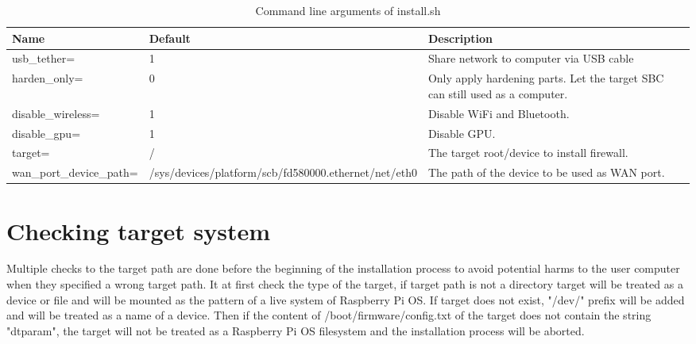 \documentclass[mscthesis]{usiinfthesis}
\begin{document}
\begin{table}[H]
  \centering
  \begin{tabular}{|m{27mm}|m{30mm}|m{68mm}|}
    \hline
    Name                              & Default                                                                         & Description                                                                  \\
    \hline
    usb\_tether=                      & 1                                                                               & Share network to computer via USB cable                                      \\
    harden\_only=                     & 0                                                                               & Only apply hardening parts. Let the target SBC can still used as a computer. \\
    disable\_wireless=                & 1                                                                               & Disable WiFi and Bluetooth.                                                  \\
    disable\_gpu=                     & 1                                                                               & Disable GPU.                                                                 \\
    target=                           & /                                                                               & The target root/device to install firewall.                                  \\
    wan\_port\_\newline device\_path= & /sys/devices/\newline platform/scb/\newline fd580000.ethernet/\newline net/eth0 & The path of the device to be used as WAN port.                               \\
    \hline
  \end{tabular}
  \caption{Command line arguments of install.sh}
  \label{tab:install_arg}
\end{table}

\section{Checking target system}
Multiple checks to the target path are done before the beginning of the installation process to avoid potential harms to the user computer when they specified a wrong target path. It at first check the type of the target, if target path is not a directory target will be treated as a device or file and will be mounted as the pattern of a live system of Raspberry Pi OS. If target does not exist, "/dev/" prefix will be added and will be treated as a name of a device. Then if the content of /boot/firmware/config.txt of the target does not contain the string "dtparam", the target will not be treated as a Raspberry Pi OS filesystem and the installation process will be aborted.
\end{document}

